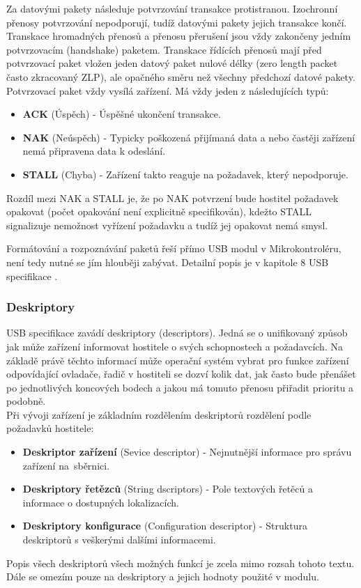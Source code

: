 Za datovými pakety následuje potvrzování transakce protistranou. Izochronní přenosy potvrzování nepodporují, tudíž datovými pakety jejich transakce končí. Transkace hromadných přenosů a přenosu přerušení jsou vždy zakončeny jedním potvrzovacím (handshake) paketem.  Transkace řídících přenosů mají před potvrzovací paket vložen jeden datový paket nulové délky (zero length packet často zkracovaný ZLP), ale opačného směru než všechny předchozí datové pakety. Potvrzovací paket vždy vysílá zařízení. Má vždy jeden z následujících typů:
\begin{itemize}
\item \textbf{ACK} (Úspěch) - Úspěšné ukončení transakce.
\item \textbf{NAK} (Neúspěch) - Typicky poškozená přijímaná data a nebo častěji zařízení nemá připravena data k odeslání.
\item \textbf{STALL} (Chyba) - Zařízení takto reaguje na požadavek, který nepodporuje.
\end{itemize}
Rozdíl mezi NAK a STALL je, že po NAK potvrzení bude hostitel požadavek opakovat (počet opakování není explicitně specifikován), kdežto STALL signalizuje nemožnost vyřízení požadavku a tudíž jej opakovat nemá smysl.

Formátování a rozpoznávání paketů řeší přímo USB modul v Mikrokontroléru, není tedy nutné se jím hlouběji zabývat. Detailní popis je v kapitole 8 USB specifikace \cite{usb-spec}.


\subsubsection{Deskriptory}
USB specifikace zavádí deskriptory (descriptors). Jedná se o unifikovaný způsob jak může zařízení informovat hostitele o svých schopnostech a požadavcích. Na základě právě těchto informací může operační systém vybrat pro funkce zařízení odpovídající ovladače, řadič v hostiteli se dozví kolik dat, jak často bude přenášet po jednotlivých koncových bodech a jakou má tomuto přenosu přiřadit prioritu a podobně.\\
Při vývoji zařízení je základním rozdělením deskriptorů rozdělení podle požadavků hostitele:
\begin{itemize}
\item \textbf{Deskriptor zařízení} (Sevice descriptor) - Nejnutnější informace pro správu zařízení na~sběrnici.
\item \textbf{Deskriptory řetězců} (String dscriptors) - Pole textových řetěců a informace o dostupných lokalizacích.
\item \textbf{Deskriptory konfigurace} (Configuration descriptor) - Struktura deskriptorů s veškerými dalšími informacemi.
\end{itemize}
Popis všech deskriptorů všech možných funkcí je zcela mimo rozsah tohoto textu. Dále se omezím pouze na deskriptory a jejich hodnoty použité v modulu.


